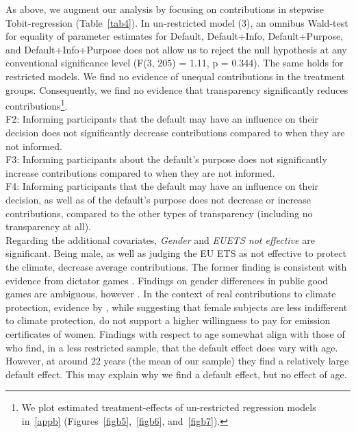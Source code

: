 \documentclass[review, authoryear,12pt]{elsarticle}
\begin{document}
As above, we augment our analysis by focusing on contributions in stepwise Tobit-regression (Table~\ref{tab4}). In un-restricted model (3), an omnibus Wald-test for equality of parameter estimates for Default, Default+Info, Default+Purpose, and Default+Info+Purpose does not allow us to reject the null hypothesis at any conventional significance level (F(3, 205) = 1.11, p = 0.344). The same holds for restricted models. We find no evidence of unequal contributions in the treatment groups. Consequently, we find no evidence that transparency significantly reduces contributions\footnote{We plot estimated treatment-effects of un-restricted regression models in~\ref{appb} (Figures~\ref{figb5},~\ref{figb6}, and~\ref{figb7}).}. \\

F2: Informing participants that the default may have an influence on their decision does not significantly decrease contributions compared to when they are not informed.\\

F3: Informing participants about the default's purpose does not significantly increase contributions compared to when they are not informed.\\

F4: Informing participants that the default may have an influence on their decision, as well as of the default's purpose does not decrease or increase contributions, compared to the other types of transparency (including no transparency at all).\\

Regarding the additional covariates, \textit{Gender} and \textit{EUETS not effective} are significant. Being male, as well as judging the EU ETS as not effective to protect the climate, decrease average contributions. The former finding is consistent with evidence from dictator games \citep{Engel.2011}. Findings on gender differences in public good games are ambiguous, however \citep{Croson.2009}. In the context of real contributions to climate protection, evidence by \cite{Diederich.2014}, while suggesting that female subjects are less indifferent to climate protection, do not support a higher willingness to pay for emission certificates of women. Findings with respect to age somewhat align with those of \cite{Borghans.2015} who find, in a less restricted sample, that the default effect does vary with age. However, at around 22 years (the mean of our sample) they find a relatively large default effect. This may explain why we find a default effect, but no effect of age.
\end{document}
